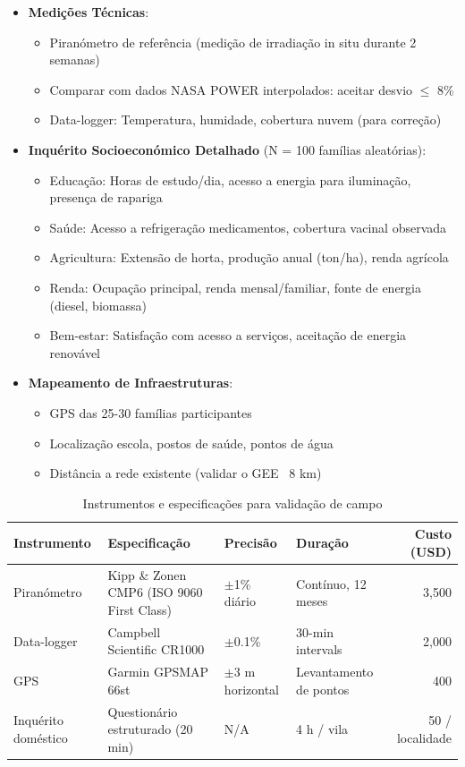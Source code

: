 \documentclass[12pt, a4paper]{article}
\begin{document}
\begin{itemize}
\item \textbf{Medições Técnicas}:
  \begin{itemize}
  \item Piranómetro de referência (medição de irradiação in situ durante 2 semanas)
  \item Comparar com dados NASA POWER interpolados: aceitar desvio \(\leq\) 8\%
  \item Data-logger: Temperatura, humidade, cobertura nuvem (para correção)
  \end{itemize}

\item \textbf{Inquérito Socioeconómico Detalhado} (N = 100 famílias aleatórias):
  \begin{itemize}
  \item Educação: Horas de estudo/dia, acesso a energia para iluminação, presença de rapariga
  \item Saúde: Acesso a refrigeração medicamentos, cobertura vacinal observada
  \item Agricultura: Extensão de horta, produção anual (ton/ha), renda agrícola
  \item Renda: Ocupação principal, renda mensal/familiar, fonte de energia (diesel, biomassa)
  \item Bem-estar: Satisfação com acesso a serviços, aceitação de energia renovável
  \end{itemize}

\item \textbf{Mapeamento de Infraestruturas}:
  \begin{itemize}
  \item GPS das 25-30 famílias participantes
  \item Localização escola, postos de saúde, pontos de água
  \item Distância a rede existente (validar o GEE ~8 km)
  \end{itemize}
\end{itemize}
\begin{table}[H]
\centering
\caption{Instrumentos e especificações para validação de campo}
\label{tab:validation_instruments}
\footnotesize
\begin{tabular}{@{}p{3.5cm}p{5cm}p{2.5cm}p{2.5cm}r@{}}
\toprule
\textbf{Instrumento} & \textbf{Especificação} & \textbf{Precisão} & \textbf{Duração} & \textbf{Custo (USD)} \\
\midrule
Piranómetro & Kipp \& Zonen CMP6 (ISO 9060 First Class) & $\pm$1\% diário & Contínuo, 12 meses & 3,500 \\
Data-logger & Campbell Scientific CR1000 & $\pm$0.1\% & 30-min intervals & 2,000 \\
GPS & Garmin GPSMAP 66st & $\pm$3 m horizontal & Levantamento de pontos & 400 \\
Inquérito doméstico & Questionário estruturado (20 min) & N/A & 4 h / vila & 50 / localidade \\
\bottomrule
\end{tabular}
\end{table}
\end{document}
